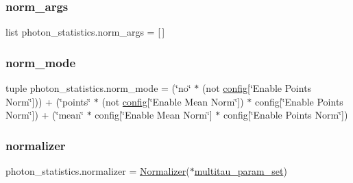 \mbox{\label{namespacephoton__statistics_af558fed5a93a7b134efea382f1ad4007}} 
\subsubsection{\texorpdfstring{norm\+\_\+args}{norm\_args}}
{\footnotesize\ttfamily list photon\+\_\+statistics.\+norm\+\_\+args = \mbox{[}$\,$\mbox{]}}

\mbox{\label{namespacephoton__statistics_a28a89caae4538b504046ed301158e677}} 
\subsubsection{\texorpdfstring{norm\+\_\+mode}{norm\_mode}}
{\footnotesize\ttfamily tuple photon\+\_\+statistics.\+norm\+\_\+mode = (\char`\"{}no\char`\"{} $\ast$ (not \hyperlink{namespacephoton__statistics_a4176c548148b1c86da6ddf320ab00e90}{config}\mbox{[}\char`\"{}Enable Points Norm\char`\"{}\mbox{]})) + (\char`\"{}points\char`\"{} $\ast$ (not \hyperlink{namespacephoton__statistics_a4176c548148b1c86da6ddf320ab00e90}{config}\mbox{[}\char`\"{}Enable Mean Norm\char`\"{}\mbox{]}) $\ast$ config\mbox{[}\char`\"{}Enable Points Norm\char`\"{}\mbox{]}) + (\char`\"{}mean\char`\"{} $\ast$ config\mbox{[}\char`\"{}Enable Mean Norm\char`\"{}\mbox{]} $\ast$ config\mbox{[}\char`\"{}Enable Points Norm\char`\"{}\mbox{]})}

\mbox{\label{namespacephoton__statistics_a4476861cf199e5ef481ee4bc15e08847}} 
\subsubsection{\texorpdfstring{normalizer}{normalizer}}
{\footnotesize\ttfamily photon\+\_\+statistics.\+normalizer = \hyperlink{classnormalizer_1_1Normalizer}{Normalizer}($\ast$\hyperlink{namespacephoton__statistics_a3c57d728c4b1cdcb2b6ca63bc6adfc4d}{multitau\+\_\+param\+\_\+set})}

